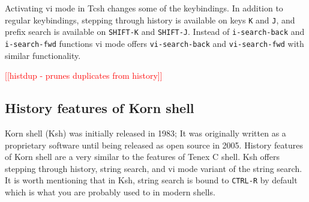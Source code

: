 \documentclass[thesis=M,english]{FITthesis}[2012/10/20]
\newcommand{\redtext}[1]{\textcolor{red}{[[#1]]}}
\begin{document}
Activating vi mode in Tcsh changes some of the keybindings. In addition to regular keybindings, stepping through history is available on keys \verb|K| and \verb|J|, and prefix search is available on \verb|SHIFT-K| and \verb|SHIFT-J|. Instead of \verb|i-search-back| and \verb|i-search-fwd| functions vi mode offers \verb|vi-search-back| and \verb|vi-search-fwd| with similar functionality.

\redtext{histdup - prunes duplicates from history}



\subsection{History features of Korn shell}
Korn shell (Ksh) was initially released in 1983; It was originally written as a proprietary software until being released as open source in 2005.  History features of Korn shell are a very similar to the features of Tenex C shell. Ksh offers stepping through history, string search, and vi mode variant of the string search. It is worth mentioning that in Ksh, string search is bound to \verb|CTRL-R| by default which is what you are probably used to in modern shells. 
\end{document}
